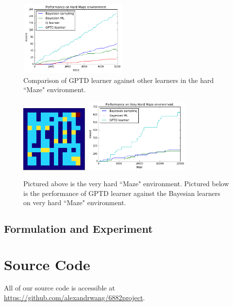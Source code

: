 \documentclass[10pt, twocolumn, twoside]{article}
\begin{document}
\begin{figure}
\centering
\includegraphics[width=0.48\textwidth]{gptdCompare}
\caption{\label{fig:easyhardPerf} Comparison of GPTD learner against other learners in the hard ``Maze" environment.}
\end{figure}
\begin{figure}
\centering
\includegraphics[width=0.30\textwidth]{veryhardmaze}
\includegraphics[width=0.48\textwidth]{veryHardMazePerf}
\caption{\label{fig:easyhardPerf} Pictured above is the very hard ``Maze" environment. Pictured below is the performance of GPTD learner against the Bayesian learners on very hard ``Maze" environment.}
\end{figure}

\subsection{Formulation and Experiment}

\section{Source Code}
All of our source code is accessible at \url{https://github.com/alexandrwang/6882project}.



\end{document}

